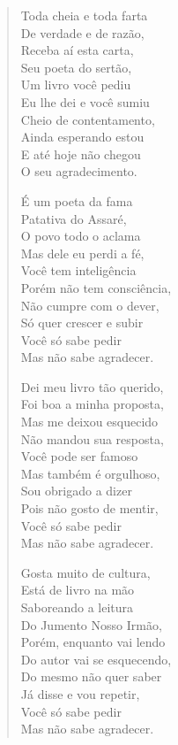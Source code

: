 \begin{verse}
Toda cheia e toda farta\\
De verdade e de razão,\\
Receba aí esta carta,\\
Seu poeta do sertão,\\
Um livro você pediu\\
Eu lhe dei e você sumiu\\
Cheio de contentamento,\\
Ainda esperando estou\\
E até hoje não chegou\\
O seu agradecimento.

É um poeta da fama\\
Patativa do Assaré,\\
O povo todo o aclama\\
Mas dele eu perdi a fé,\\
Você tem inteligência\\
Porém não tem consciência,\\
Não cumpre com o dever,\\
Só quer crescer e subir\\
Você só sabe pedir\\
Mas não sabe agradecer.

Dei meu livro tão querido,\\
Foi boa a minha proposta,\\
Mas me deixou esquecido\\
Não mandou sua resposta,\\
Você pode ser famoso\\
Mas também é orgulhoso,\\
Sou obrigado a dizer\\
Pois não gosto de mentir,\\
Você só sabe pedir\\
Mas não sabe agradecer.

Gosta muito de cultura,\\
Está de livro na mão\\
Saboreando a leitura\\
Do Jumento Nosso Irmão,\\
Porém, enquanto vai lendo\\
Do autor vai se esquecendo,\\
Do mesmo não quer saber\\
Já disse e vou repetir,\\
Você só sabe pedir\\
Mas não sabe agradecer.


\end{verse}
